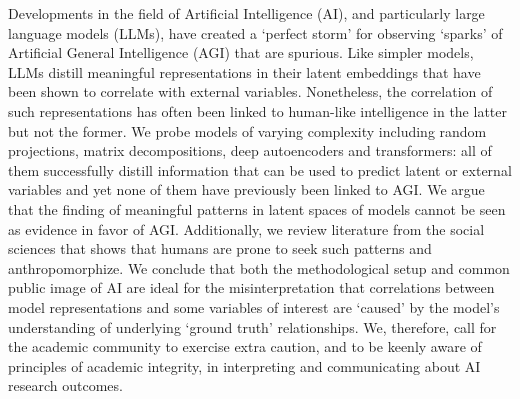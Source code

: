 Developments in the field of Artificial Intelligence (AI), and particularly large language models (LLMs), have created a `perfect storm’ for observing `sparks’ of Artificial General Intelligence (AGI) that are spurious. Like simpler models, LLMs distill meaningful representations in their latent embeddings that have been shown to correlate with external variables. Nonetheless, the correlation of such representations has often been linked to human-like intelligence in the latter but not the former. We probe models of varying complexity including random projections, matrix decompositions, deep autoencoders and transformers: all of them successfully distill information that can be used to predict latent or external variables and yet none of them have previously been linked to AGI. We argue that the finding of meaningful patterns in latent spaces of models cannot be seen as evidence in favor of AGI. Additionally, we review literature from the social sciences that shows that humans are prone to seek such patterns and anthropomorphize. We conclude that both the methodological setup and common public image of AI are ideal for the misinterpretation that correlations between model representations and some variables of interest are `caused' by the model's understanding of underlying `ground truth’ relationships. We, therefore, call for the academic community to exercise extra caution, and to be keenly aware of principles of academic integrity, in interpreting and communicating about AI research outcomes.